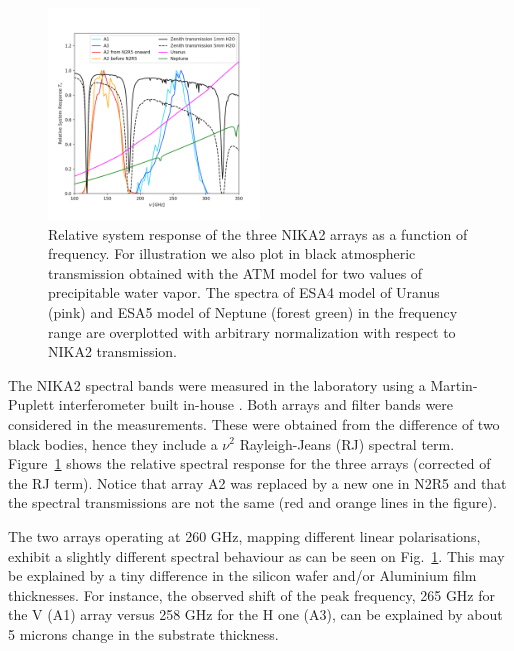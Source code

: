 \begin{figure}[ht!] %
\begin{center}
\includegraphics[clip,trim={0, 1cm, 0, 2cm},width=0.5\textwidth]{Figures/bandpasses_nika2_colorsok.png}
\caption[NIKA2 transmission]{Relative system response of the three NIKA2 arrays as a
  function of frequency. For illustration we also plot in black atmospheric transmission obtained with the ATM model \cite{ATM, Pardo2002} for two values of precipitable water vapor. The spectra of ESA4 model of Uranus (pink) and ESA5 model of Neptune \cite{ESAmodel} (forest green) in the frequency range are overplotted with arbitrary normalization with respect to NIKA2 transmission.} 
 \label{spectralband1}
\end{center}
\end{figure}

The NIKA2 spectral bands were measured in the laboratory using a
Martin-Puplett interferometer built in-house \cite{durand}.  Both
arrays and filter bands were considered in the measurements. These
were obtained from the difference of two black bodies, hence they
include a $\nu^2$ Rayleigh-Jeans (RJ) spectral term.
Figure~\ref{spectralband1} shows the relative spectral response for
the three arrays (corrected of the RJ term).  Notice that array A2 was
replaced by a new one in N2R5 and that the spectral transmissions are
not the same (red and orange lines in the figure).

The two arrays operating at 260 GHz, mapping different linear polarisations,
exhibit a slightly different spectral behaviour as can be
seen on Fig.~\ref{spectralband1}. This may be explained by a tiny
difference in the silicon wafer and/or Aluminium film thicknesses. For
instance, the observed shift of the peak frequency, 265 GHz for the V
(A1) array versus 258 GHz for the H one (A3), can be explained by
about 5 microns change in the substrate thickness. 

